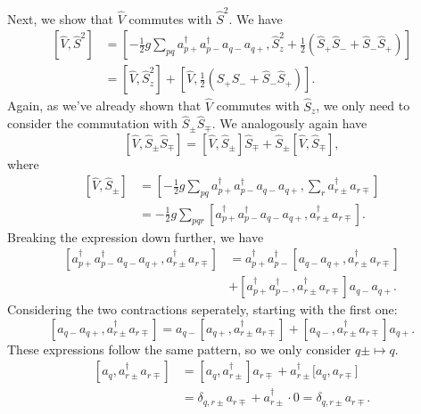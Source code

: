 Next, we show that $\hat{V}$ commutes with $\hat{S}^2$.
We have
\begin{align*}
    \left[ \hat{V}, \hat{S}^2 \right]
    &= \left[
        -\frac{1}{2} g \sum_{pq} a_{p+}^\dagger a_{p-}^\dagger a_{q-} a_{q+},
        \hat{S}_z^2 + \frac{1}{2}(\hat{S}_+ \hat{S}_- + \hat{S}_- \hat{S}_+)
    \right] \\
    &= \left[ \hat{V}, \hat{S}_z^2 \right] + \left[ \hat{V}, \frac{1}{2}(\hat{S}_+ \hat{S}_- + \hat{S}_- \hat{S}_+) \right].
\end{align*}
Again, as we've already shown that $\hat{V}$ commutes with $\hat{S}_z$, we only need to consider the commutation with $\hat{S}_\pm \hat{S}_\mp$.
We analogously again have
\begin{equation*}
    \left[ \hat{V}, \hat{S}_\pm \hat{S}_\mp \right]
    = \left[ \hat{V}, \hat{S}_\pm \right] \hat{S}_\mp + \hat{S}_\pm \left[ \hat{V}, \hat{S}_\mp \right],
\end{equation*}
where
\begin{align*}
    \left[ \hat{V}, \hat{S}_{\pm} \right]
    &= \left[
        -\frac{1}{2} g \sum_{pq} a_{p+}^\dagger a_{p-}^\dagger a_{q-} a_{q+},
        \sum_{r} a^\dag_{r\pm} a_{r\mp}
    \right] \\
    &= -\frac{1}{2} g \sum_{pqr} \left[
        a_{p+}^\dagger a_{p-}^\dagger a_{q-} a_{q+},
        a^\dag_{r\pm} a_{r\mp}
    \right].
\end{align*}
Breaking the expression down further, we have
\begin{equation}\label{eq:V_to_S_comm}
    \begin{split}
        \left[
            a_{p+}^\dagger a_{p-}^\dagger a_{q-} a_{q+},
            a^\dag_{r\pm} a_{r\mp}
        \right] &= a_{p+}^\dagger a_{p-}^\dagger \left[ a_{q-} a_{q+}, a^\dag_{r\pm} a_{r\mp} \right] \\
        &+ \left[ a_{p+}^\dagger a_{p-}^\dagger, a^\dag_{r\pm} a_{r\mp} \right] a_{q-} a_{q+}.
    \end{split}
\end{equation}
Considering the two contractions seperately, starting with the first one:
\begin{equation*}
    \left[ a_{q-} a_{q+}, a^\dag_{r\pm} a_{r\mp} \right]
    = a_{q-} \left[ a_{q+}, a^\dag_{r\pm} a_{r\mp} \right] + \left[ a_{q-}, a^\dag_{r\pm} a_{r\mp} \right] a_{q+}.
\end{equation*}
These expressions follow the same pattern, so we only consider $q \pm \mapsto q$.
\begin{align*}
    \left[ a_{q}, a^\dag_{r\pm} a_{r\mp} \right]
    &= \left[ a_q, a^\dag_{r\pm} \right] a_{r \mp} + a^\dag_{r\pm} \Big[ a_q, a_{r\mp} \Big] \\
    &= \delta_{q, r\pm} a_{r\mp} + a^\dag_{r\pm} \cdot 0 = \delta_{q, r\pm} a_{r\mp}.
\end{align*}
